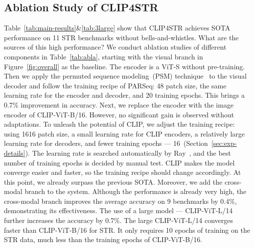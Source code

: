 \documentclass[lettersize,journal]{IEEEtran}
\begin{document}
\subsection{Ablation Study of CLIP4STR}
Table~\ref{tab:main-results}\&\ref{tab:3large} show that
CLIP4STR achieves SOTA performance on 11 STR benchmarks without bells-and-whistles.
What are the sources of this high performance?
We conduct ablation studies of different components in Table~\ref{tab:abla}, starting with the visual branch in Figure~\ref{fig:overall} as the baseline.
The encoder is a ViT-S without pre-training.
Then we apply the permuted sequence modeling~(PSM) technique~\cite{2022_parseq} to the visual decoder and follow the training recipe of PARSeq:
48 patch size, the same learning rate for the encoder and decoder, and 20 training epochs.
This brings a 0.7\% improvement in accuracy.
Next, we replace the encoder with the image encoder of CLIP-ViT-B/16.
However, no significant gain is observed without adaptations.
To unleash the potential of CLIP, we adjust the training recipe: using 1616 patch size, a small learning rate for CLIP encoders, a relatively large learning rate for decoders, and fewer training epochs --- 16~(Section~\ref{sec:exp-details}).
The learning rate is searched automatically by Ray~\cite{moritz2018ray}, and the best number of training epochs is decided by manual test.
CLIP makes the model converge easier and faster, so the training recipe should change accordingly.
At this point, we already surpass the previous SOTA.
Moreover, we add the cross-modal branch to the system.
Although the performance is already very high, the cross-modal branch improves the average accuracy on 9 benchmarks by 0.4\%, demonstrating its effectiveness.
The use of a large model --- CLIP-ViT-L/14 further increases the accuracy by 0.7\%.
The large CLIP-ViT-L/14 converges faster than CLIP-ViT-B/16 for STR. It only requires 10 epochs of training on the STR data, much less than the training epochs of CLIP-ViT-B/16.
\end{document}
